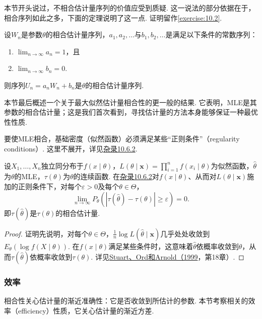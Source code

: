 本节开头说过，不相合估计量序列的价值应受到质疑. 这一说法的部分依据在于，相合序列如此之多，下面的定理说明了这一点. 证明留作\autoref{exercise:10.2}.

\begin{theorem}\label{thm:10.1.5}
设$W_n$是参数$\theta$的相合估计量序列，$a_1,a_2,\ldots$与$b_1,b_2,\ldots$是满足以下条件的常数序列：
\begin{enumerate}[label=\roman*.]
\item $\lim_{n\to\infty}a_n=1$，且
\item $\lim_{n\to\infty}b_n=0$.
\end{enumerate}
则序列$U_n=a_nW_n+b_n$是$\theta$的相合估计量序列.
\end{theorem}

本节最后概述一个关于最大似然估计量相合性的更一般的结果. 它表明，MLE是其参数的相合估计量；这是我们首次看到，寻找估计量的方法本身能够保证一种最优性性质.

要使MLE相合，基础密度（似然函数）必须满足某些“正则条件”（regularity conditions）. 这里不展开，详见\hyperref[sec:10.6.2]{杂录10.6.2}.

\begin{theorem}[MLE的相合性]\label{thm:10.1.6}
设$X_1,\ldots,X_n$独立同分布于$f(x\mid\theta)$，$L(\theta\mid\boldsymbol x)=\prod_{i=1}^nf(x_i\mid\theta)$为似然函数，$\hat\theta$为$\theta$的MLE，$\tau(\theta)$为$\theta$的连续函数. 在\hyperref[sec:10.6.2]{杂录10.6.2}对$f(x\mid\theta)$、从而对$L(\theta\mid\boldsymbol x)$施加的正则条件下，对每个$\varepsilon>0$及每个$\theta\in\Theta$，
$$\lim_{n\to\infty}P_\theta(|\tau(\hat\theta)-\tau(\theta)|\geq\varepsilon)=0.$$
即$\tau(\hat\theta)$是$\tau(\theta)$的相合估计量.
\end{theorem}
\begin{proof}
证明先说明，对每个$\theta\in\Theta$，$\frac1n\log L(\hat\theta\mid\boldsymbol x)$几乎处处收敛到$E_\theta(\log f(X\mid\theta))$. 在$f(x\mid\theta)$满足某些条件时，这意味着$\hat\theta$依概率收敛到$\theta$，从而$\tau(\hat\theta)$依概率收敛到$\tau(\theta)$. 详见\hyperref[bib:source311]{Stuart、Ord和Arnold（1999}，第18章）.
\end{proof}

\subsubsection{效率}\label{sec:10.1.2}
相合性关心估计量的渐近准确性：它是否收敛到所估计的参数. 本节考察相关的效率（efficiency）性质，它关心估计量的渐近方差.

